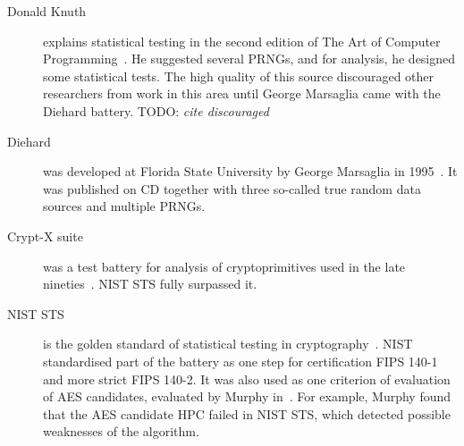 \documentclass[
  print, %
  Table,   %
  nolof,     %
  nolot,     %
  11pt, %
  oneside  %
]{fithesis3}
\newcommand{\todo}[1]{TODO: \textit{#1}}
\begin{document}

\begin{description}
    \item[Donald Knuth] explains statistical testing in the second edition of The Art of Computer Programming~\cite{knuth1969vol}. He suggested several PRNGs, and for analysis, he designed some statistical tests. The high quality of this source discouraged other researchers from work in this area until George Marsaglia came with the Diehard battery. \todo{cite discouraged} %
    \item[Diehard] was developed at Florida State University by George Marsaglia in 1995~\cite{marsaglia1996diehard}. It was published on CD together with three so-called true random data sources and multiple PRNGs. %
    \item[Crypt-X suite] was a test battery for analysis of cryptoprimitives used in the late nineties~\cite{cryptxs}. NIST STS fully surpassed it. %
    \item[NIST STS] is the golden standard of statistical testing in cryptography~\cite{rukhin2001statistical}. NIST standardised part of the battery as one step for certification FIPS 140-1 and more strict FIPS 140-2. It was also used as one criterion of evaluation of AES candidates, evaluated by Murphy in~\cite{murphy2000power}. For example, Murphy found that the AES candidate HPC failed in NIST STS, which detected possible weaknesses of the algorithm.


\end{description}
\end{document}
